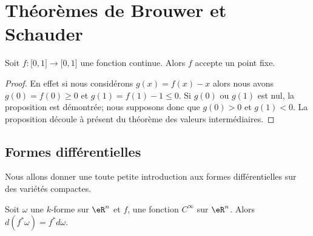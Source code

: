 \section{Théorèmes de Brouwer et Schauder}

\begin{proposition}
    Soit \( f\colon \mathopen[ 0 , 1 \mathclose]\to \mathopen[ 0 , 1 \mathclose]\) une fonction continue. Alors \( f\) accepte un point fixe.
\end{proposition}

\begin{proof}
    En effet si nous considérons \( g(x)=f(x)-x\) alors nous avons \( g(0)=f(0)\geq 0\) et \( g(1)=f(1)-1\leq 0\). Si \( g(0)\) ou \( g(1)\) est nul, la proposition est démontrée; nous supposons donc que \( g(0)>0\) et \( g(1)<0\). La proposition découle à présent du théorème des valeurs intermédiaires.
\end{proof}

\subsection{Formes différentielles}

Nous allons donner une toute petite introduction aux formes différentielles sur des variétés compactes.

\begin{lemma}       \label{LemdwLGFG}
    Soit \( \omega\) une \( k\)-forme sur \( \eR^n\) et \( f\), une fonction \( C^{\infty}\) sur \( \eR^n\). Alors \( d(f^*\omega)=f^*d\omega\).
\end{lemma}

